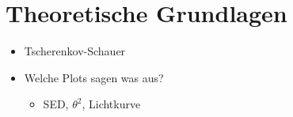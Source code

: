 \section{Theoretische Grundlagen}%
\label{sec:theoretische_grundlagen}
\begin{itemize}
  \item Tscherenkov-Schauer
  \item Welche Plots sagen was aus?
    \begin{itemize}
      \item SED, $\theta^2$, Lichtkurve
    \end{itemize}
\end{itemize}
